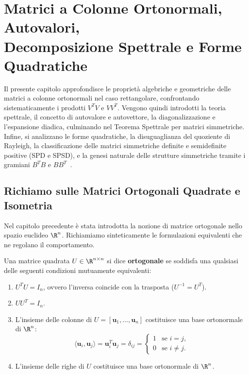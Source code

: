 \chapter[Matrici Ortonormali, Autovalori e Forme Quadratiche]{Matrici a Colonne Ortonormali, Autovalori,\\Decomposizione Spettrale e Forme Quadratiche}
\label{chap:matrici-ortonormali-autovalori-forme-quadratiche}

Il presente capitolo approfondisce le propriet\`a algebriche e geometriche delle matrici a colonne ortonormali nel caso rettangolare, confrontando sistematicamente i prodotti $V^T V$ e $V V^T$. Vengono quindi introdotti la teoria spettrale, il concetto di autovalore e autovettore, la diagonalizzazione e l'espansione diadica, culminando nel Teorema Spettrale per matrici simmetriche. Infine, si analizzano le forme quadratiche, la disuguaglianza del quoziente di Rayleigh, la classificazione delle matrici simmetriche definite e semidefinite positive (SPD e SPSD), e la genesi naturale delle strutture simmetriche tramite i gramiani $B^T B$ e $B B^T$~\cite{trefethen1997numerical}.

\FloatBarrier
\section{Richiamo sulle Matrici Ortogonali Quadrate e Isometria}

Nel capitolo precedente \`e stata introdotta la nozione di matrice ortogonale nello spazio euclideo $\R^n$. Richiamiamo sinteticamente le formulazioni equivalenti che ne regolano il comportamento.

\begin{definition}
\label{def:ortogonale-quadrata-recap}
Una matrice quadrata $U \in \R^{n \times n}$ si dice \textbf{ortogonale} se soddisfa una qualsiasi delle seguenti condizioni mutuamente equivalenti:
\begin{enumerate}
    \item $U^T U = I_n$, ovvero l'inversa coincide con la trasposta ($U^{-1} = U^T$).
    \item $U U^T = I_n$.
    \item L'insieme delle colonne di $U = [\mathbf{u}_1, \dots, \mathbf{u}_n]$ costituisce una base ortonormale di $\R^n$:
    \begin{equation}
        \langle \mathbf{u}_i, \mathbf{u}_j \rangle = \mathbf{u}_i^T \mathbf{u}_j = \delta_{ij} = \begin{cases} 1 & \text{se } i = j, \\ 0 & \text{se } i \neq j. \end{cases}
    \end{equation}
    \item L'insieme delle righe di $U$ costituisce una base ortonormale di $\R^n$.
\end{enumerate}
\end{definition}

